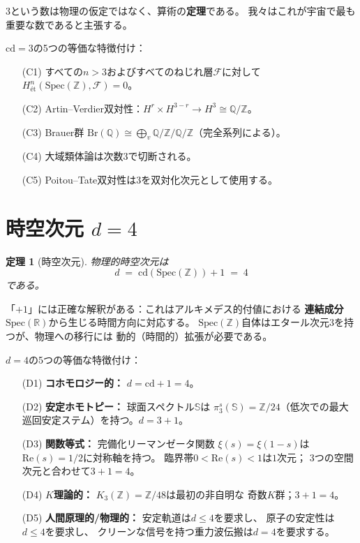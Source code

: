 \documentclass[12pt,a4paper]{article}
\newtheorem{theorem}{定理}[section]
\theoremstyle{definition}
\newcommand{\Spec}{\mathrm{Spec}}
\newcommand{\cd}{\mathrm{cd}}
\newcommand{\Z}{\mathbb{Z}}
\newcommand{\Q}{\mathbb{Q}}
\newcommand{\R}{\mathbb{R}}
\begin{document}
$3$という数は物理の仮定ではなく、算術の\textbf{定理}である。
我々はこれが宇宙で最も重要な数であると主張する。

$\cd=3$の5つの等価な特徴付け：
\begin{itemize}
\item[(C1)] すべての$n>3$およびすべてのねじれ層$\mathscr{F}$に対して$H^n_{\text{\'et}}(\Spec(\Z),\mathscr{F})=0$。
\item[(C2)] Artin--Verdier双対性：$H^r\times H^{3-r}\to H^3\cong\Q/\Z$。
\item[(C3)] Brauer群 $\mathrm{Br}(\Q)\cong\bigoplus_v\Q/\Z\big/\Q/\Z$（完全系列による）。
\item[(C4)] 大域類体論は次数$3$で切断される。
\item[(C5)] Poitou--Tate双対性は$3$を双対化次元として使用する。
\end{itemize}

\section{時空次元 $d=4$}\label{sec:spacetime}

\begin{theorem}[時空次元]\label{thm:d4}
物理的時空次元は
\[
  d \;=\; \cd(\Spec(\Z))+1 \;=\; 4
\]
である。
\end{theorem}

「$+1$」には正確な解釈がある：これはアルキメデス的付値における
\textbf{連結成分}$\Spec(\R)$から生じる時間方向に対応する。
$\Spec(\Z)$自体はエタール次元$3$を持つが、物理への移行には
動的（時間的）拡張が必要である。

$d=4$の5つの等価な特徴付け：

\begin{itemize}
\item[(D1)] \textbf{コホモロジー的：} $d=\cd+1=4$。
\item[(D2)] \textbf{安定ホモトピー：} 球面スペクトル$\mathbb{S}$は
  $\pi_3^s(\mathbb{S})=\Z/24$（低次での最大巡回安定ステム）を持つ。$d=3+1$。
\item[(D3)] \textbf{関数等式：} 完備化リーマンゼータ関数
  $\xi(s)=\xi(1-s)$は$\mathrm{Re}(s)=1/2$に対称軸を持つ。
  臨界帯$0<\mathrm{Re}(s)<1$は$1$次元；
  3つの空間次元と合わせて$3+1=4$。
\item[(D4)] \textbf{$K$理論的：} $K_3(\Z)=\Z/48$は最初の非自明な
  奇数$K$群；$3+1=4$。
\item[(D5)] \textbf{人間原理的/物理的：} 安定軌道は$d\le 4$を要求し、
  原子の安定性は$d\le 4$を要求し、
  クリーンな信号を持つ重力波伝搬は$d=4$を要求する。
\end{itemize}
\end{document}
